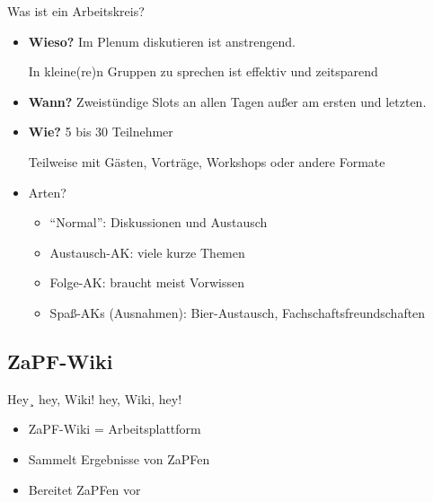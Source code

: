 \documentclass[compress,]{beamer}
\begin{document}
\begin{frame}{Was ist ein Arbeitskreis?}

  \begin{itemize}[<+->]
  \item \textbf{Wieso?} Im Plenum diskutieren ist anstrengend.

    In kleine(re)n Gruppen zu sprechen ist effektiv und zeitsparend
  \item \textbf{Wann?} Zweistündige Slots an allen Tagen außer am ersten und letzten.
  \item \textbf{Wie?} 5 bis 30 Teilnehmer

    Teilweise mit Gästen, Vorträge, Workshops oder andere Formate
  \item Arten?
    \begin{itemize}[<+->]
    \item ``Normal'': Diskussionen und Austausch
    \item Austausch-AK: viele kurze Themen
    \item Folge-AK: braucht meist Vorwissen
    \item Spaß-AKs (Ausnahmen): Bier-Austausch, Fachschaftsfreundschaften
    \end{itemize}
  \end{itemize}

\end{frame}


\subsection{ZaPF-Wiki}

\begin{frame}{Hey¸ hey, Wiki! hey, Wiki, hey!}

\begin{itemize}[<+->]
	\item ZaPF-Wiki = Arbeitsplattform
	\item Sammelt Ergebnisse von ZaPFen
	\item Bereitet ZaPFen vor
\end{itemize}

\end{frame}
\end{document}
